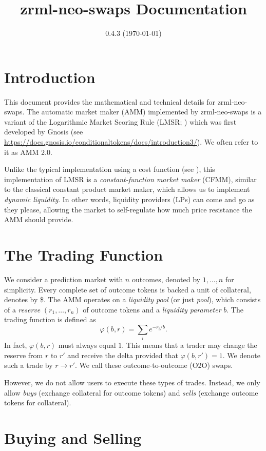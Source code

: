 \documentclass[12pt]{article}
\title{zrml-neo-swaps Documentation}
\date{0.4.3 (\today)}
\begin{document}
\maketitle

\section{Introduction}

This document provides the mathematical and technical details for zrml-neo-swaps. The automatic market maker (AMM) implemented by zrml-neo-swaps is a variant of the Logarithmic Market Scoring Rule (LMSR; \cite{hanson_2003}) which was first developed by Gnosis (see \url{https://docs.gnosis.io/conditionaltokens/docs/introduction3/}). We often refer to it as AMM 2.0.

Unlike the typical implementation using a cost function (see \cite{chen_vaughan_2010}), this implementation of LMSR is a \emph{constant-function market maker} (CFMM), similar to the classical constant product market maker, which allows us to implement \emph{dynamic liquidity}. In other words, liquidity providers (LPs) can come and go as they please, allowing the market to self-regulate how much price resistance the AMM should provide.

\section{The Trading Function}

We consider a prediction market with $n$ outcomes, denoted by $1, \ldots, n$ for simplicity. Every complete set of outcome tokens is backed a unit of collateral, denotes by \$. The AMM operates on a \emph{liquidity pool} (or just \emph{pool}), which consists of a \emph{reserve} $(r_1, \ldots, r_n)$ of outcome tokens and a \emph{liquidity parameter} $b$. The trading function is defined as
\[
    \varphi(b, r) = \sum_i e^{-r_i/b}.
\]
In fact, $\varphi(b, r)$ must always equal $1$. This means that a trader may change the reserve from $r$ to $r'$ and receive the delta provided that $\varphi(b, r') = 1$. We denote such a trade by $r \rightarrow r'$. We call these outcome-to-outcome (O2O) swaps.

However, we do not allow users to execute these types of trades. Instead, we only allow \emph{buys} (exchange collateral for outcome tokens) and \emph{sells} (exchange outcome tokens for collateral).

\section{Buying and Selling}
\end{document}
